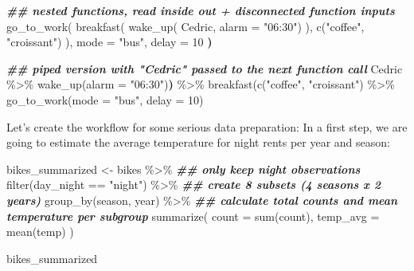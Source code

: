 \documentclass[
]{krantz}
\makeatletter
\newenvironment{Shaded}{\begin{snugshade}}{\end{snugshade}}
\newcommand{\AttributeTok}[1]{\textcolor[rgb]{0.61,0.61,0.61}{#1}}
\newcommand{\DecValTok}[1]{\textcolor[rgb]{0.06,0.06,0.06}{#1}}
\newcommand{\DocumentationTok}[1]{\textcolor[rgb]{0.37,0.37,0.37}{\textbf{\textit{#1}}}}
\newcommand{\ErrorTok}[1]{\textcolor[rgb]{0.14,0.14,0.14}{\textbf{#1}}}
\newcommand{\FunctionTok}[1]{\textcolor[rgb]{0,0,0}{#1}}
\newcommand{\NormalTok}[1]{#1}
\newcommand{\OtherTok}[1]{\textcolor[rgb]{0.37,0.37,0.37}{#1}}
\newcommand{\SpecialCharTok}[1]{\textcolor[rgb]{0,0,0}{#1}}
\newcommand{\StringTok}[1]{\textcolor[rgb]{0.5,0.5,0.5}{#1}}
\newenvironment{kframe}{%
\medskip{}
\setlength{\fboxsep}{.8em}
 \def\at@end@of@kframe{}%
 \ifinner\ifhmode%
  \def\at@end@of@kframe{\end{minipage}}%
  \begin{minipage}{\columnwidth}%
 \fi\fi%
 \def\FrameCommand##1{\hskip\@totalleftmargin \hskip-\fboxsep
 \colorbox{shadecolor}{##1}\hskip-\fboxsep
     \hskip-\linewidth \hskip-\@totalleftmargin \hskip\columnwidth}%
 \MakeFramed {\advance\hsize-\width
   \@totalleftmargin\z@ \linewidth\hsize
   \@setminipage}}%
 {\par\unskip\endMakeFramed%
 \at@end@of@kframe}
\renewenvironment{Shaded}{\begin{kframe}}{\end{kframe}}
\makeatother
\begin{document}
\begin{Shaded}
\begin{Highlighting}[]
\DocumentationTok{\#\# nested functions, read inside out + disconnected function inputs}
\FunctionTok{go\_to\_work}\NormalTok{(}
  \FunctionTok{breakfast}\NormalTok{(}
    \FunctionTok{wake\_up}\NormalTok{(}
\NormalTok{      Cedric, }\AttributeTok{alarm =} \StringTok{"06:30"}\NormalTok{)}
\NormalTok{    ), }
    \FunctionTok{c}\NormalTok{(}\StringTok{"coffee"}\NormalTok{, }\StringTok{"croissant"}\NormalTok{)}
\NormalTok{  ),}
\NormalTok{  mode }\OtherTok{=} \StringTok{"bus"}\NormalTok{, delay }\OtherTok{=} \DecValTok{10}
\ErrorTok{)}

\DocumentationTok{\#\# piped version with "Cedric" passed to the next function call}
\NormalTok{Cedric }\SpecialCharTok{\%\textgreater{}\%} 
  \FunctionTok{wake\_up}\NormalTok{(}\AttributeTok{alarm =} \StringTok{"06:30"}\NormalTok{)}\ErrorTok{)} \SpecialCharTok{\%\textgreater{}\%} 
  \FunctionTok{breakfast}\NormalTok{(}\FunctionTok{c}\NormalTok{(}\StringTok{"coffee"}\NormalTok{, }\StringTok{"croissant"}\NormalTok{) }\SpecialCharTok{\%\textgreater{}\%} 
  \FunctionTok{go\_to\_work}\NormalTok{(}\AttributeTok{mode =} \StringTok{"bus"}\NormalTok{, }\AttributeTok{delay =} \DecValTok{10}\NormalTok{)}
\end{Highlighting}
\end{Shaded}

Let's create the workflow for some serious data preparation: In a first step, we are going to estimate the average temperature for night rents per year and season:

\begin{Shaded}
\begin{Highlighting}[]
\NormalTok{bikes\_summarized }\OtherTok{\textless{}{-}} 
\NormalTok{  bikes }\SpecialCharTok{\%\textgreater{}\%} 
  \DocumentationTok{\#\# only keep night observations}
  \FunctionTok{filter}\NormalTok{(day\_night }\SpecialCharTok{==} \StringTok{"night"}\NormalTok{) }\SpecialCharTok{\%\textgreater{}\%} 
  \DocumentationTok{\#\# create 8 subsets (4 seasons x 2 years)}
  \FunctionTok{group\_by}\NormalTok{(season, year) }\SpecialCharTok{\%\textgreater{}\%} 
  \DocumentationTok{\#\# calculate total counts and mean temperature per subgroup}
  \FunctionTok{summarize}\NormalTok{(}
    \AttributeTok{count =} \FunctionTok{sum}\NormalTok{(count), }
    \AttributeTok{temp\_avg =} \FunctionTok{mean}\NormalTok{(temp)}
\NormalTok{  )}

\NormalTok{bikes\_summarized}
\end{Highlighting}
\end{Shaded}
\end{document}
